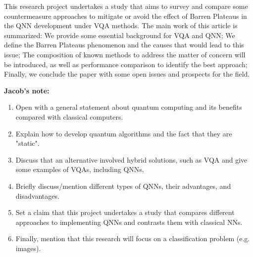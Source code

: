 This research project undertakes a study that aims to survey and compare some countermeasure approaches to mitigate or avoid the effect of Barren Plateaus in the QNN development under VQA methods. 
The main work of this article is summarized: 
We provide some essential background for VQA and QNN;
We define the Barren Plateaus phenomenon and the causes that would lead to this issue; 
The composition of known methods to address the matter of concern will be introduced, as well as performance comparison to identify the best approach; 
Finally, we conclude the paper with some open issues and prospects for the field.


\vspace{60pt}
\textbf {Jacob's note:}
\begin{enumerate}
    \item Open with a general statement about quantum computing and its benefits compared with classical computers.
    \item Explain how to develop quantum algorithms and the fact that they are "static".
    \item Discuss that an alternative involved hybrid solutions, such as VQA and give some examples of VQAs, including QNNs, 
    \item Briefly discuss/mention different types of QNNs, their advantages, and disadvantages.
    \item Set a claim that this project undertakes a study that compares different approaches to implementing QNNs and contrasts them with classical NNs.
    \item Finally, mention that this research will focus on a classification problem (e.g. images).
\end{enumerate}